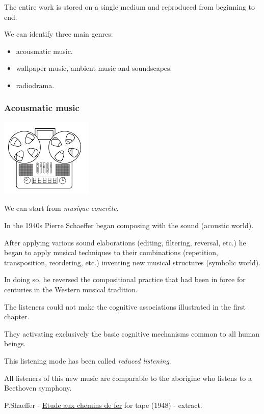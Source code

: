 The entire work is stored on a single medium and reproduced from beginning to end.

We can identify three main genres:

\begin{itemize}
\tightlist
\item acousmatic music.
\item wallpaper music, ambient music and soundscapes.
\item radiodrama.
\end{itemize}

\subsubsection{Acousmatic music }\label{acousmatic-music}

\begin{center}
\includegraphics[scale=0.5]{../img/tape.png}
\end{center}

We can start from \textit{musique concrète}.

In the 1940s Pierre Schaeffer began composing with the sound (acoustic world).

After applying various sound elaborations (editing, filtering, reversal, etc.) he began to apply musical techniques to their combinations (repetition, transposition, reordering, etc.) inventing new musical structures (symbolic world).

In doing so, he reversed the compositional practice that had been in force for centuries in the Western musical tradition.

The listeners could not make the cognitive associations illustrated in the first chapter.

They activating exclusively the basic cognitive mechanisms common to all human beings.

This listening mode has been called \textit{reduced listening}.

All listeners of this new music are comparable to the aborigine who listens to a Beethoven symphony.

P.Shaeffer - \href{http://www.musicaecodice.it/gitmedia/emc/2_media/shaeffer.mp3}{Etude aux chemins de fer} for tape (1948) - extract.

